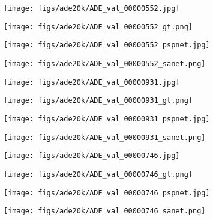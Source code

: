 \documentclass[10pt,twocolumn,twoside]{IEEEtran}
\begin{document}
\begin{figure*}[t]\centering
\begin{minipage}{0.2\textwidth}
	\texttt{[image: figs/ade20k/ADE\_val\_00000552.jpg]}
\end{minipage}
\begin{minipage}{0.2\textwidth}
	\texttt{[image: figs/ade20k/ADE\_val\_00000552\_gt.png]}
\end{minipage}	
\begin{minipage}{0.2\textwidth}	
	\texttt{[image: figs/ade20k/ADE\_val\_00000552\_pspnet.jpg]}    	
\end{minipage}
\begin{minipage}{0.2\textwidth}
	\texttt{[image: figs/ade20k/ADE\_val\_00000552\_sanet.png]}
\end{minipage}

\begin{minipage}{0.2\textwidth}
	\texttt{[image: figs/ade20k/ADE\_val\_00000931.jpg]}
\end{minipage}
\begin{minipage}{0.2\textwidth}
	\texttt{[image: figs/ade20k/ADE\_val\_00000931\_gt.png]}
\end{minipage}
\begin{minipage}{0.2\textwidth}	
	\texttt{[image: figs/ade20k/ADE\_val\_00000931\_pspnet.jpg]}    	
\end{minipage}
\begin{minipage}{0.2\textwidth}
	\texttt{[image: figs/ade20k/ADE\_val\_00000931\_sanet.png]}
\end{minipage}


\begin{minipage}{0.2\textwidth}
	\texttt{[image: figs/ade20k/ADE\_val\_00000746.jpg]}
\end{minipage}
\begin{minipage}{0.2\textwidth}
	\texttt{[image: figs/ade20k/ADE\_val\_00000746\_gt.png]}
\end{minipage}
\begin{minipage}{0.2\textwidth}	
	\texttt{[image: figs/ade20k/ADE\_val\_00000746\_pspnet.jpg]}    	
\end{minipage}
\begin{minipage}{0.2\textwidth}
	\texttt{[image: figs/ade20k/ADE\_val\_00000746\_sanet.png]}
\end{minipage}


\end{figure*}
\end{document}
